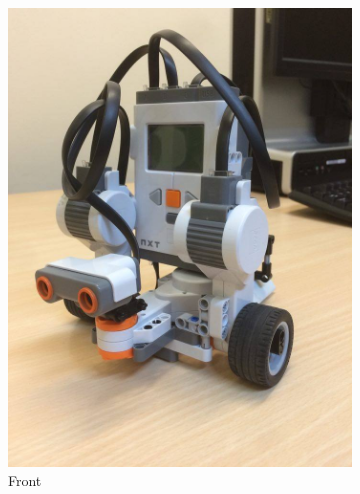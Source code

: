 \documentclass[12pt]{article}
\begin{document}
\begin{figure}[h!]
	\centering
	\begin{subfigure}[b]{0.3\textwidth}
		\includegraphics[width=\textwidth]{robot1}
		\caption{Front}
		\label{fig:front}
	\end{subfigure}
	~ %
	\begin{subfigure}[b]{0.3\textwidth}

\end{subfigure}
\end{figure}
\end{document}
